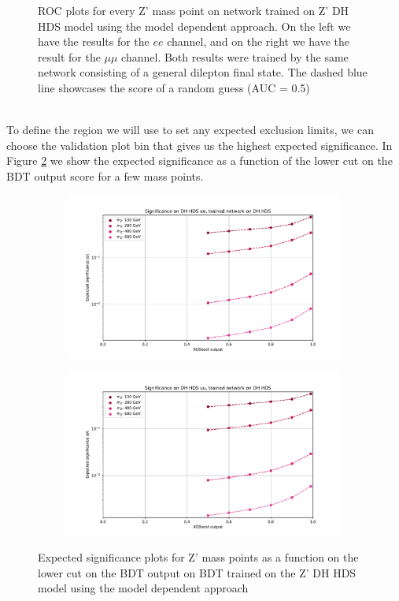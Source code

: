 \documentclass[12pt, a4paper]{book}
\begin{document}
\begin{figure}[!ht]
\begin{subfigure}[b]{0.49\textwidth}
      \end{subfigure}
   \caption[ROC plots for every Z' mass point on network trained on Z' DH HDS model using the model dependent approach]{ROC plots for every Z' mass point on network trained on Z' DH HDS model using the model dependent approach. On the left we have the results for the $ee$ channel, and on the right we have the result for the $\mu\mu$ channel. Both results were 
   trained by the same network consisting of a general dilepton final state. The dashed blue line showcases the score of a random guess (AUC = 0.5)}\label{fig:DH_HDS_ROCS}
\end{figure}
\\To define the region we will use to set any expected exclusion limits, we can choose the validation plot bin that gives us the highest expected significance. In Figure \ref{fig:DH_HDS_exp_sig} we show the expected significance as a function of the lower cut on the BDT output score 
for a few mass points. 
\begin{figure}[!ht]
	\centering
	\begin{subfigure}[b]{0.49\textwidth}
      \centering
      \includegraphics[width=1\textwidth]{XGBoost/DH_HDS/EXP_SIG_ee.pdf}
      \end{subfigure}
   \hfill
   \begin{subfigure}[b]{0.49\textwidth}
      \centering
      \includegraphics[width=1\textwidth]{XGBoost/DH_HDS/EXP_SIG_uu.pdf}
      \end{subfigure}
   \caption{Expected significance plots for Z' mass points as a function on the lower cut on the BDT output on BDT trained on the Z' DH HDS model using the model dependent approach}\label{fig:DH_HDS_exp_sig}
\end{figure}
\end{document}
